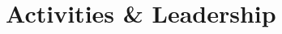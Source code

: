 \documentclass[a4paper,10pt]{extarticle} %
\begin{document}

\vspace{-0.6cm}
\section{\textcolor{primary}{Activities \& Leadership}}
\end{document}
